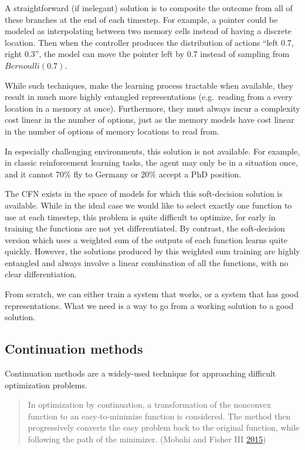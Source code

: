 \documentclass[12pt,twoside]{mitthesis}
\begin{document}
A straightforward (if inelegant) solution is to composite the outcome
from all of these branches at the end of each timestep. For example, a
pointer could be modeled as interpolating between two memory cells
instead of having a discrete location. Then when the controller produces
the distribution of actions ``left 0.7, right 0.3'', the model can move
the pointer left by 0.7 instead of sampling from $Bernoulli(0.7)$.

While such techniques, make the learning process tractable when
available, they result in much more highly entangled representations
(e.g.~reading from a every location in a memory at once). Furthermore,
they must always incur a complexity cost linear in the number of
options, just as the memory models have cost linear in the number of
options of memory locations to read from.

In especially challenging environments, this solution is not available.
For example, in classic reinforcement learning tasks, the agent may only
be in a situation once, and it cannot 70\% fly to Germany or 20\% accept
a PhD position.

The CFN exists in the space of models for which this soft-decision
solution is available. While in the ideal case we would like to select
exactly one function to use at each timestep, this problem is quite
difficult to optimize, for early in training the functions are not yet
differentiated. By contrast, the soft-decision version which uses a
weighted sum of the outputs of each function learns quite quickly.
However, the solutions produced by this weighted sum training are highly
entangled and always involve a linear combination of all the functions,
with no clear differentiation.

From scratch, we can either train a system that works, or a system that
has good representations. What we need is a way to go from a working
solution to a good solution.

\subsection{Continuation methods}\label{sec:continuation}

Continuation methods are a widely-used technique for approaching
difficult optimization problems.

\begin{quote}
In optimization by continuation, a transformation of the nonconvex
function to an easy-to-minimize function is considered. The method then
progressively converts the easy problem back to the original function,
while following the path of the minimizer. (Mobahi and Fisher III
\protect\hyperlink{ref-mobahi2015theoretical}{2015})
\end{quote}
\end{document}
